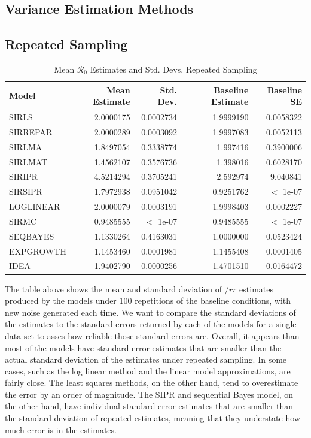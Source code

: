 \documentclass[12pt]{article}
\newcommand{\rr}{\ensuremath{\mathcal{R}_0}}
\begin{document}
\subsection{Variance Estimation Methods}

\subsection{Repeated Sampling}

\begin{table}[H]
	
	\centering
	\begin{tabular}[t]{l|r|r|r|r}
		\hline
		Model & Mean Estimate & Std. Dev. & Baseline Estimate & Baseline SE\\
		\hline
		SIRLS & 2.0000175 & 0.0002734 & 1.9999190 & 0.0058322\\
		\hline
		SIRREPAR & 2.0000289 & 0.0003092 & 1.9997083 & 0.0052113\\
		\hline
		SIRLMA & 1.8497054 & 0.3338774 & 1.997416 & 0.3900006\\
		\hline
		SIRLMAT & 1.4562107 & 0.3576736 & 1.398016 & 0.6028170 \\
		\hline
		SIRIPR & 4.5214294 & 0.3705241 & 2.592974 & 9.040841\\
		\hline
		SIRSIPR & 1.7972938 & 0.0951042 & 0.9251762 & $<$ 1e-07 \\
		\hline
		LOGLINEAR & 2.0000079 & 0.0003191 & 1.9998403 & 0.0002227\\
		\hline
		SIRMC & 0.9485555 & $<$ 1e-07 & 0.9485555 & $<$ 1e-07\\
		\hline
		SEQBAYES & 1.1330264 & 0.4163031 & 1.0000000 & 0.0523424\\
		\hline
		EXPGROWTH & 1.1453460 & 0.0001981 & 1.1455408 & 0.0001405 \\
		\hline
		IDEA & 1.9402790 & 0.0000256 & 1.4701510 & 0.0164472 \\
		\hline
	\end{tabular}
\caption{\label{tab:rep-samp}Mean $\rr$ Estimates and Std. Devs, Repeated Sampling}
\end{table}

The table above shows the mean and standard deviation of $/rr$ estimates produced by the models under 100 repetitions of the baseline conditions, with new noise generated each time. We want to compare the standard deviations of the estimates to the standard errors returned by each of the models for a single data set to asses how reliable those standard errors are. Overall, it appears than most of the models have standard error estimates that are smaller than the actual standard deviation of the estimates under repeated sampling. In some cases, such as the log linear method and the linear model approximations, are fairly close. The least squares methods, on the other hand, tend to overestimate the error by an order of magnitude. The SIPR and sequential Bayes model, on the other hand, have individual standard error estimates that are smaller than the standard deviation of repeated estimates, meaning that they understate how much error is in the estimates.
\end{document}
